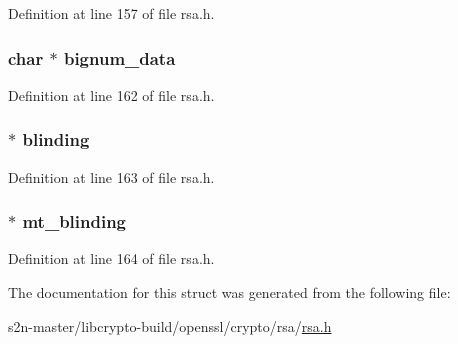 Definition at line 157 of file rsa.\+h.

\subsubsection[{\texorpdfstring{bignum\+\_\+data}{bignum_data}}]{\setlength{\rightskip}{0pt plus 5cm}char $\ast$ bignum\+\_\+data}\hypertarget{structrsa__st_a011a2c596f08669113df7125718cbb5e}{}\label{structrsa__st_a011a2c596f08669113df7125718cbb5e}


Definition at line 162 of file rsa.\+h.

\subsubsection[{\texorpdfstring{blinding}{blinding}}]{ $\ast$ blinding}\hypertarget{structrsa__st_acefa66837a7d5554aa3c473b994a9c33}{}\label{structrsa__st_acefa66837a7d5554aa3c473b994a9c33}


Definition at line 163 of file rsa.\+h.

\subsubsection[{\texorpdfstring{mt\+\_\+blinding}{mt_blinding}}]{ $\ast$ mt\+\_\+blinding}\hypertarget{structrsa__st_a6fcbfb2cf4903d40d8c510eb05088f2c}{}\label{structrsa__st_a6fcbfb2cf4903d40d8c510eb05088f2c}


Definition at line 164 of file rsa.\+h.



The documentation for this struct was generated from the following file\+:\begin{DoxyCompactItemize}
\item 
s2n-\/master/libcrypto-\/build/openssl/crypto/rsa/\hyperlink{crypto_2rsa_2rsa_8h}{rsa.\+h}\end{DoxyCompactItemize}
